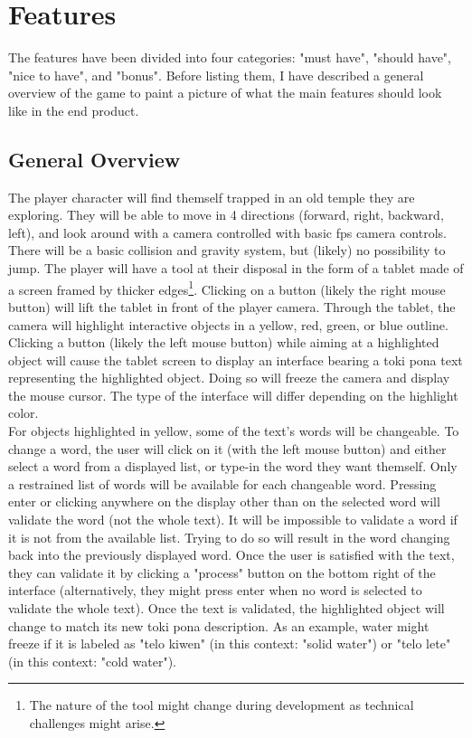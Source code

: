 \documentclass{scrartcl}
\begin{document}
	\section{Features}
		The features have been divided into four categories: "must have", "should have", "nice to have", and "bonus". Before listing them, I have described a general overview of the game to paint a picture of what the main features should look like in the end product.
		\subsection{General Overview}
			The player character will find themself trapped in an old temple they are exploring. They will be able to move in 4 directions (forward, right, backward, left), and look around with a camera controlled with basic fps camera controls. There will be a basic collision and gravity system, but (likely) no possibility to jump. The player will have a tool at their disposal in the form of a tablet made of a screen framed by thicker edges\footnote{The nature of the tool might change during development as technical challenges might arise.}. Clicking on a button (likely the right mouse button) will lift the tablet in front of the player camera. Through the tablet, the camera will highlight interactive objects in a yellow, red, green, or blue outline. Clicking a button  (likely the left mouse button) while aiming at a highlighted object will cause the tablet screen to display an interface bearing a toki pona text representing the highlighted object. Doing so will freeze the camera and display the mouse cursor. The type of the interface will differ depending on the highlight color.\\
			For objects highlighted in yellow, some of the text's words will be changeable. To change a word, the user will click on it (with the left mouse button) and either select a word from a displayed list, or type-in the word they want themself. Only a restrained list of words will be available for each changeable word. Pressing enter or clicking anywhere on the display other than on the selected word will validate the word (not the whole text). It will be impossible to validate a word if it is not from the available list. Trying to do so will result in the word changing back into the previously displayed word. Once the user is satisfied with the text, they can validate it by clicking a "process" button on the bottom right of the interface (alternatively, they might press enter when no word is selected to validate the whole text). Once the text is validated, the highlighted object will change to match its new toki pona description. As an example, water might freeze if it is labeled as "telo kiwen" (in this context: "solid water") or "telo lete" (in this context: "cold water").\\
\end{document}
